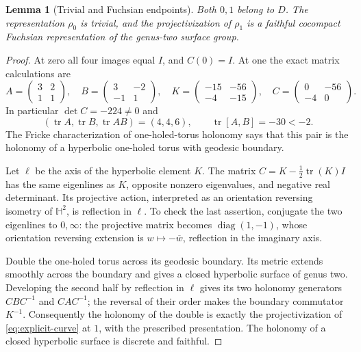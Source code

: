 \documentclass[11pt,letterpaper]{amsart}
\newtheorem{lemma}[theorem]{Lemma}
\theoremstyle{definition}
\theoremstyle{remark}
\numberwithin{equation}{section}
\begin{document}
\begin{lemma}[Trivial and Fuchsian endpoints]\label{lem:curve-endpoints}
Both $0,1$ belong to $D$. The representation $\rho_0$ is trivial,
and the projectivization of $\rho_1$ is a faithful cocompact Fuchsian
representation of the genus-two surface group.
\end{lemma}
\begin{proof}
At zero all four images equal $I$, and $C(0)=I$.
At one the exact matrix calculations are
\[
 A=\begin{pmatrix}3&2\\1&1\end{pmatrix},\quad
 B=\begin{pmatrix}3&-2\\-1&1\end{pmatrix},\quad
 K=\begin{pmatrix}-15&-56\\-4&-15\end{pmatrix},\quad
 C=\begin{pmatrix}0&-56\\-4&0\end{pmatrix}.
\]
In particular $\det C=-224\ne0$ and
\[
 (\operatorname{tr}A,\operatorname{tr}B,\operatorname{tr}AB)=(4,4,6),
 \qquad \operatorname{tr}[A,B]=-30<-2.
\]
The Fricke characterization of one-holed-torus holonomy
\cite[Theorem 4.1.2 and Section 4.4]{GoldmanFricke} says that this pair is the
holonomy of a hyperbolic one-holed torus with geodesic boundary.

Let $\ell$ be the axis of the hyperbolic element $K$.
The matrix $C=K-\tfrac12\operatorname{tr}(K)I$ has the same eigenlines
as $K$, opposite nonzero eigenvalues, and negative real determinant.
Its projective action, interpreted as an orientation reversing isometry
of $\mathbb H^2$, is reflection in $\ell$. To check the last assertion,
conjugate the two eigenlines to $0,\infty$: the projective matrix becomes
$\operatorname{diag}(1,-1)$, whose orientation reversing extension is
$w\mapsto-\overline w$, reflection in the imaginary axis.

Double the one-holed torus across its geodesic boundary. Its metric
extends smoothly across the boundary and gives a closed hyperbolic
surface of genus two. Developing the second half by reflection in
$\ell$ gives its two holonomy generators $CBC^{-1}$ and $CAC^{-1}$;
the reversal of their order makes the boundary commutator $K^{-1}$.
Consequently the holonomy of the double is exactly the projectivization
of \eqref{eq:explicit-curve} at $1$, with the prescribed presentation.
The holonomy of a closed hyperbolic surface is discrete and faithful.
\end{proof}
\end{document}
